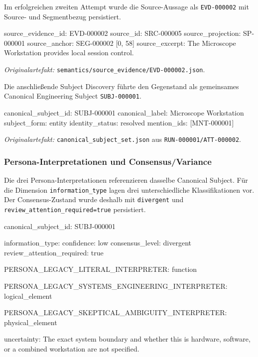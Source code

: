 Im erfolgreichen zweiten Attempt wurde die Source-Aussage als
\texttt{EVD-000002} mit Source- und Segmentbezug persistiert.

\begin{evidencebox}
source_evidence_id: EVD-000002
source_id:          SRC-000005
source_projection:  SP-000001
source_anchor:      SEG-000002 [0, 58]
source_excerpt:     The Microscope Workstation provides local session control.
\end{evidencebox}

\noindent\textit{Originalartefakt:}
\texttt{semantics/source\_evidence/EVD-000002.json}.

Die anschließende Subject Discovery führte den Gegenstand als gemeinsames
Canonical Engineering Subject \texttt{SUBJ-000001}.

\begin{evidencebox}
canonical_subject_id: SUBJ-000001
canonical_label:      Microscope Workstation
subject_form:         entity
identity_status:      resolved
mention_ids:          [MNT-000001]
\end{evidencebox}

\noindent\textit{Originalartefakt:}
\texttt{canonical\_subject\_set.json} aus
\texttt{RUN-000001/ATT-000002}.

\subsubsection{Persona-Interpretationen und Consensus/Variance}

Die drei Persona-Interpretationen referenzieren dasselbe Canonical Subject.
Für die Dimension \texttt{information\_type} lagen drei unterschiedliche
Klassifikationen vor. Der Consensus-Zustand wurde deshalb mit
\texttt{divergent} und \texttt{review\_attention\_required=true} persistiert.

\begin{evidencebox}
canonical_subject_id: SUBJ-000001

information_type:
  confidence:                low
  consensus_level:           divergent
  review_attention_required: true

  PERSONA_LEGACY_LITERAL_INTERPRETER:
    function

  PERSONA_LEGACY_SYSTEMS_ENGINEERING_INTERPRETER:
    logical_element

  PERSONA_LEGACY_SKEPTICAL_AMBIGUITY_INTERPRETER:
    physical_element

uncertainty:
  The exact system boundary and whether this is hardware,
  software, or a combined workstation are not specified.
\end{evidencebox}

